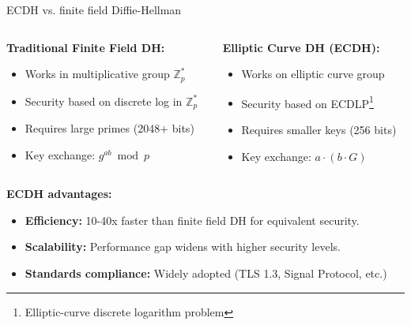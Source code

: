 \documentclass[aspectratio=169, lualatex, handout]{beamer}
\begin{document}
\begin{frame}{ECDH vs. finite field Diffie-Hellman}
	\begin{columns}
		\begin{column}{0.5\textwidth}
			\textbf{Traditional Finite Field DH:}
			\begin{itemize}
				\item Works in multiplicative group $\mathbb{Z}_p^*$
				\item Security based on discrete log in $\mathbb{Z}_p^*$
				\item Requires large primes (2048+ bits)
				\item Key exchange: $g^{ab} \bmod p$
			\end{itemize}
		\end{column}
		\begin{column}{0.5\textwidth}
			\textbf{Elliptic Curve DH (ECDH):}
			\begin{itemize}
				\item Works on elliptic curve group
				\item Security based on ECDLP\footnote{Elliptic-curve discrete logarithm problem}
				\item Requires smaller keys (256 bits)
				\item Key exchange: $a \cdot (b \cdot G)$
			\end{itemize}
		\end{column}
	\end{columns}
	\vspace{0.5cm}
	\textbf{ECDH advantages:}
	\begin{itemize}
		\item \textbf{Efficiency:} 10-40x faster than finite field DH for equivalent security.
		\item \textbf{Scalability:} Performance gap widens with higher security levels.
		\item \textbf{Standards compliance:} Widely adopted (TLS 1.3, Signal Protocol, etc.)
	\end{itemize}
\end{frame}
\end{document}
